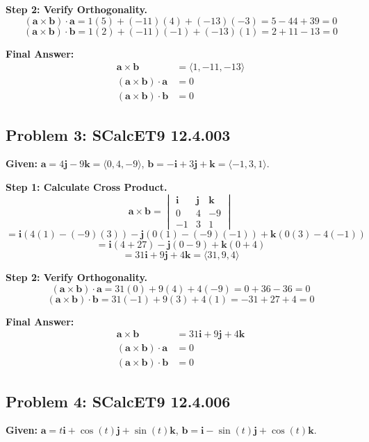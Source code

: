 \documentclass[11pt]{article}
\renewcommand{\vec}[1]{\mathbf{#1}}
\newcommand{\ihat}{\mathbf{i}}
\newcommand{\jhat}{\mathbf{j}}
\newcommand{\khat}{\mathbf{k}}
\begin{document}
\textbf{Step 2: Verify Orthogonality.}
\[
(\vec{a} \times \vec{b}) \cdot \vec{a} = 1(5) + (-11)(4) + (-13)(-3) = 5 - 44 + 39 = 0
\]
\[
(\vec{a} \times \vec{b}) \cdot \vec{b} = 1(2) + (-11)(-1) + (-13)(1) = 2 + 11 - 13 = 0
\]

\textbf{Final Answer:}
\begin{align*}
\vec{a} \times \vec{b} &= \langle 1, -11, -13 \rangle \\
(\vec{a} \times \vec{b}) \cdot \vec{a} &= 0 \\
(\vec{a} \times \vec{b}) \cdot \vec{b} &= 0
\end{align*}

\hrulefill

\subsection*{Problem 3: SCalcET9 12.4.003}
\textbf{Given:} $\vec{a} = 4\jhat - 9\khat = \langle 0, 4, -9 \rangle$, $\vec{b} = -\ihat + 3\jhat + \khat = \langle -1, 3, 1 \rangle$.

\textbf{Step 1: Calculate Cross Product.}
\[
\vec{a} \times \vec{b} = \begin{vmatrix} \ihat & \jhat & \khat \\ 0 & 4 & -9 \\ -1 & 3 & 1 \end{vmatrix}
\]
\[
= \ihat (4(1) - (-9)(3)) - \jhat (0(1) - (-9)(-1)) + \khat (0(3) - 4(-1))
\]
\[
= \ihat (4 + 27) - \jhat (0 - 9) + \khat (0 + 4)
\]
\[
= 31\ihat + 9\jhat + 4\khat = \langle 31, 9, 4 \rangle
\]

\textbf{Step 2: Verify Orthogonality.}
\[
(\vec{a} \times \vec{b}) \cdot \vec{a} = 31(0) + 9(4) + 4(-9) = 0 + 36 - 36 = 0
\]
\[
(\vec{a} \times \vec{b}) \cdot \vec{b} = 31(-1) + 9(3) + 4(1) = -31 + 27 + 4 = 0
\]

\textbf{Final Answer:}
\begin{align*}
\vec{a} \times \vec{b} &= 31\ihat + 9\jhat + 4\khat \\
(\vec{a} \times \vec{b}) \cdot \vec{a} &= 0 \\
(\vec{a} \times \vec{b}) \cdot \vec{b} &= 0
\end{align*}

\hrulefill

\subsection*{Problem 4: SCalcET9 12.4.006}
\textbf{Given:} $\vec{a} = t\ihat + \cos(t)\jhat + \sin(t)\khat$, $\vec{b} = \ihat - \sin(t)\jhat + \cos(t)\khat$.
\end{document}
